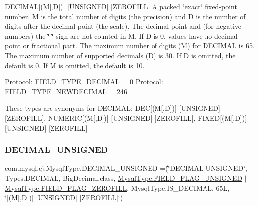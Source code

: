 D\+E\+C\+I\+M\+AL\mbox{[}(M\mbox{[},D\mbox{]})\mbox{]} \mbox{[}U\+N\+S\+I\+G\+N\+ED\mbox{]} \mbox{[}Z\+E\+R\+O\+F\+I\+LL\mbox{]} A packed \char`\"{}exact\char`\"{} fixed-\/point number. M is the total number of digits (the precision) and D is the number of digits after the decimal point (the scale). The decimal point and (for negative numbers) the \char`\"{}-\/\char`\"{} sign are not counted in M. If D is 0, values have no decimal point or fractional part. The maximum number of digits (M) for D\+E\+C\+I\+M\+AL is 65. The maximum number of supported decimals (D) is 30. If D is omitted, the default is 0. If M is omitted, the default is 10.

Protocol\+: F\+I\+E\+L\+D\+\_\+\+T\+Y\+P\+E\+\_\+\+D\+E\+C\+I\+M\+AL = 0 Protocol\+: F\+I\+E\+L\+D\+\_\+\+T\+Y\+P\+E\+\_\+\+N\+E\+W\+D\+E\+C\+I\+M\+AL = 246

These types are synonyms for D\+E\+C\+I\+M\+AL\+: D\+EC\mbox{[}(M\mbox{[},D\mbox{]})\mbox{]} \mbox{[}U\+N\+S\+I\+G\+N\+ED\mbox{]} \mbox{[}Z\+E\+R\+O\+F\+I\+LL\mbox{]}, N\+U\+M\+E\+R\+IC\mbox{[}(M\mbox{[},D\mbox{]})\mbox{]} \mbox{[}U\+N\+S\+I\+G\+N\+ED\mbox{]} \mbox{[}Z\+E\+R\+O\+F\+I\+LL\mbox{]}, F\+I\+X\+ED\mbox{[}(M\mbox{[},D\mbox{]})\mbox{]} \mbox{[}U\+N\+S\+I\+G\+N\+ED\mbox{]} \mbox{[}Z\+E\+R\+O\+F\+I\+LL\mbox{]} \mbox{\label{enumcom_1_1mysql_1_1cj_1_1_mysql_type_acf73450623fafadf72095ff8bcab078e}} 
\subsubsection{\texorpdfstring{D\+E\+C\+I\+M\+A\+L\+\_\+\+U\+N\+S\+I\+G\+N\+ED}{DECIMAL\_UNSIGNED}}
{\footnotesize\ttfamily com.\+mysql.\+cj.\+Mysql\+Type.\+D\+E\+C\+I\+M\+A\+L\+\_\+\+U\+N\+S\+I\+G\+N\+ED =(\char`\"{}D\+E\+C\+I\+M\+AL U\+N\+S\+I\+G\+N\+ED\char`\"{}, Types.\+D\+E\+C\+I\+M\+AL, Big\+Decimal.\+class, \mbox{\hyperlink{enumcom_1_1mysql_1_1cj_1_1_mysql_type_a2c6701614559b1ad9955cdc4ca6337e2}{Mysql\+Type.\+F\+I\+E\+L\+D\+\_\+\+F\+L\+A\+G\+\_\+\+U\+N\+S\+I\+G\+N\+ED}} $\vert$ \mbox{\hyperlink{enumcom_1_1mysql_1_1cj_1_1_mysql_type_abb76a1f2f3dac9a30d1b559b8ba66a48}{Mysql\+Type.\+F\+I\+E\+L\+D\+\_\+\+F\+L\+A\+G\+\_\+\+Z\+E\+R\+O\+F\+I\+LL}}, Mysql\+Type.\+I\+S\+\_\+\+D\+E\+C\+I\+M\+AL, 65\+L, \char`\"{}\mbox{[}(\+M\mbox{[},\+D\mbox{]})\mbox{]} \mbox{[}\+U\+N\+S\+I\+G\+N\+E\+D\mbox{]} \mbox{[}\+Z\+E\+R\+O\+F\+I\+L\+L\mbox{]}\char`\"{})}

